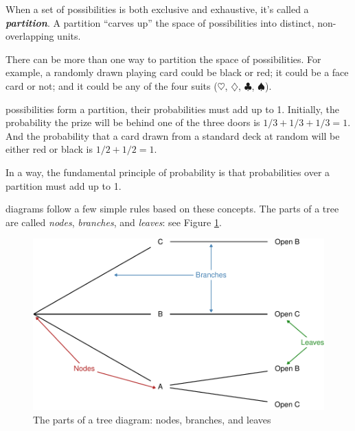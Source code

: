 \documentclass[justified]{tufte-book}
\theoremstyle{definition}
\theoremstyle{definition}
\theoremstyle{definition}
\theoremstyle{remark}
\begin{document}
When a set of possibilities is both exclusive and exhaustive, it's called a \textbf{\emph{partition}}. A partition ``carves up'' the space of possibilities into distinct, non-overlapping units.

There can be more than one way to partition the space of possibilities. For example, a randomly drawn playing card could be black or red; it could be a face card or not; and it could be any of the four suits (\(\heartsuit\), \(\diamondsuit\), \(\clubsuit\), \(\spadesuit\)).

 possibilities form a partition, their probabilities must add up to 1. Initially, the probability the prize will be behind one of the three doors is \(1/3 + 1/3 + 1/3 = 1\). And the probability that a card drawn from a standard deck at random will be either red or black is \(1/2 + 1/2 = 1\).

In a way, the fundamental principle of probability is that probabilities over a partition must add up to 1.

 diagrams follow a few simple rules based on these concepts. The parts of a tree are called \emph{nodes}, \emph{branches}, and \emph{leaves}: see Figure \ref{fig:treeparts}.

\begin{figure}
\includegraphics{_main_files/figure-latex/treeparts-1} \caption[The parts of a tree diagram]{The parts of a tree diagram: nodes, branches, and leaves}\label{fig:treeparts}
\end{figure}
\end{document}
